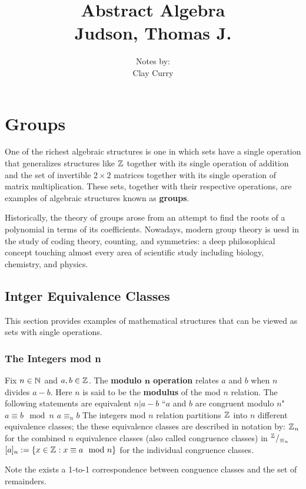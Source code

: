 \documentclass[11pt]{article} %
\title{Abstract Algebra \\ Judson, Thomas J.}
\author{Notes by:  \\ Clay Curry}
\date{}
\begin{document}
\maketitle
{}
\section{Groups}

One of the richest algebraic structures is one in which sets have a single operation that generalizes structures like $\text{$\mathbb{Z}^{}$}$ together with its single operation of addition and the set of invertible $2 \times 2$ matrices together with its single operation of matrix multiplication. These sets, together with their respective operations, are examples of algebraic structures known as \textbf{groups}.

Historically, the theory of groups arose from an attempt to find the roots of a polynomial in terms of its coefficients. Nowadays, modern group theory is uesd in the study of coding theory, counting, and symmetries: a deep philosophical concept touching almost every area of scientific study including biology, chemistry, and physics.

\subsection{Intger Equivalence Classes}

This section provides examples of mathematical structures that can be viewed as sets with single operations.

\subsubsection{The Integers mod n}
{Fix $n \in \text{$\mathbb{N}^{}$}$ and $a,b \in \text{$\mathbb{Z}^{}$}$. The \textbf{modulo $\mathbf{n}$ operation} relates $a$ and $b$ when $n$ divides $a-b$. Here $n$ is said to be the \textbf{modulus} of the mod $n$ relation.  The following statements are equivalent
\points
{$n | a - b$}
{``$a$ and $b$ are congruent modulo $n$"}
{$a \equiv b \mod n$}
{$a \equiv_n b$}
The integers mod $n$ relation partitions $\text{$\mathbb{Z}^{}$}$ into $n$ different equivalence classes; the these equivalence classes are described in notation by:
\points
{$\text{$\mathbb{Z}^{}$}_n$ for the combined $n$ equivalence classes (also called congruence classes)  in $^{\text{$\mathbb{Z}^{}$}} / _{\equiv_n}$ }
{$[a]_n := \{x \in \text{$\mathbb{Z}^{}$}: x \equiv a \mod n\}$ for the individual congruence classes.}
}

Note the exists a 1-to-1 correspondence between conguence classes and the set of remainders.
\end{document}
